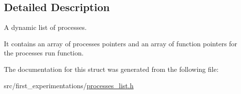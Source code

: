\subsection{Detailed Description}
A dynamic list of processes. 

It contains an array of processes pointers and an array of function pointers for the processes run function. 

The documentation for this struct was generated from the following file\-:\begin{DoxyCompactItemize}
\item 
src/first\-\_\-experimentations/\hyperlink{processes__list_8h}{processes\-\_\-list.\-h}\end{DoxyCompactItemize}
